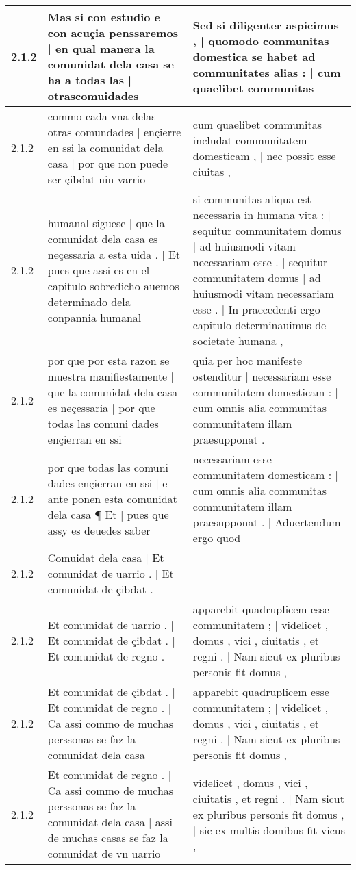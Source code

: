 \begin{tabular}{|p{1cm}|p{6.5cm}|p{6.5cm}|}
2.1.2 & Mas si con estudio e con acuçia penssaremos | en qual manera la comunidat dela casa se ha a todas las | otrascomuidades & Sed si diligenter aspicimus , | quomodo communitas domestica se habet ad communitates alias : | cum quaelibet communitas \\\hline
2.1.2 & commo cada vna delas otras comundades | ençierre en ssi la comunidat dela casa | por que non puede ser çibdat nin varrio & cum quaelibet communitas | includat communitatem domesticam , | nec possit esse ciuitas , \\\hline
2.1.2 & humanal siguese | que la comunidat dela casa es neçessaria a esta uida . | Et pues que assi es en el capitulo sobredicho auemos determinado dela conpannia humanal & si communitas aliqua est necessaria in humana vita : | sequitur communitatem domus | ad huiusmodi vitam necessariam esse . | sequitur communitatem domus | ad huiusmodi vitam necessariam esse . | In praecedenti ergo capitulo determinauimus de societate humana , \\\hline
2.1.2 & por que por esta razon se muestra manifiestamente | que la comunidat dela casa es neçessaria | por que todas las comuni dades ençierran en ssi & quia per hoc manifeste ostenditur | necessariam esse communitatem domesticam : | cum omnis alia communitas communitatem illam praesupponat . \\\hline
2.1.2 & por que todas las comuni dades ençierran en ssi | e ante ponen esta comunidat dela casa ¶ Et | pues que assy es deuedes saber & necessariam esse communitatem domesticam : | cum omnis alia communitas communitatem illam praesupponat . | Aduertendum ergo quod \\\hline
2.1.2 & Comuidat dela casa | Et comunidat de uarrio . | Et comunidat de çibdat . &  \\\hline
2.1.2 & Et comunidat de uarrio . | Et comunidat de çibdat . | Et comunidat de regno . & apparebit quadruplicem esse communitatem ; | videlicet , domus , vici , ciuitatis , et regni . | Nam sicut ex pluribus personis fit domus , \\\hline
2.1.2 & Et comunidat de çibdat . | Et comunidat de regno . | Ca assi commo de muchas perssonas se faz la comunidat dela casa & apparebit quadruplicem esse communitatem ; | videlicet , domus , vici , ciuitatis , et regni . | Nam sicut ex pluribus personis fit domus , \\\hline
2.1.2 & Et comunidat de regno . | Ca assi commo de muchas perssonas se faz la comunidat dela casa | assi de muchas casas se faz la comunidat de vn uarrio & videlicet , domus , vici , ciuitatis , et regni . | Nam sicut ex pluribus personis fit domus , | sic ex multis domibus fit vicus , \\\hline

\end{tabular}
